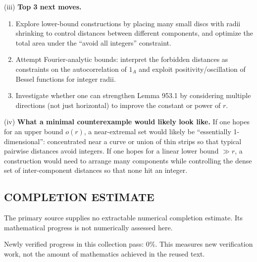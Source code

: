 (iii) \textbf{Top 3 next moves.}
\begin{enumerate}
\item Explore lower-bound constructions by placing many small discs with radii shrinking to control distances between different components, and optimize the total area under the ``avoid all integers'' constraint.
\item Attempt Fourier-analytic bounds: interpret the forbidden distances as constraints on the autocorrelation of $1_A$ and exploit positivity/oscillation of Bessel functions for integer radii.
\item Investigate whether one can strengthen Lemma 953.1 by considering multiple directions (not just horizontal) to improve the constant or power of $r$.
\end{enumerate}

(iv) \textbf{What a minimal counterexample would likely look like.}
If one hopes for an upper bound $o(r)$, a near-extremal set would likely be ``essentially 1-dimensional'': concentrated near a curve or union of thin strips so that typical pairwise distances avoid integers. If one hopes for a linear lower bound $\gg r$, a construction would need to arrange many components while controlling the dense set of inter-component distances so that none hit an integer.



\subsection*{COMPLETION ESTIMATE}
The primary source supplies no extractable numerical completion estimate. Its mathematical progress is not numerically assessed here.

Newly verified progress in this collection pass: $0\%$. This measures new verification work, not the amount of mathematics achieved in the reused text.
